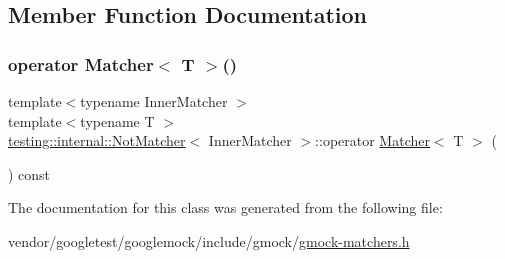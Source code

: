 \subsection{Member Function Documentation}
\mbox{\label{classtesting_1_1internal_1_1_not_matcher_a87ad7beadf9def58cc053229e99e8625}} 
\subsubsection{\texorpdfstring{operator Matcher$<$ T $>$()}{operator Matcher< T >()}}
{\footnotesize\ttfamily template$<$typename Inner\+Matcher $>$ \\
template$<$typename T $>$ \\
\hyperlink{classtesting_1_1internal_1_1_not_matcher}{testing\+::internal\+::\+Not\+Matcher}$<$ Inner\+Matcher $>$\+::operator \hyperlink{classtesting_1_1_matcher}{Matcher}$<$ T $>$ (\begin{DoxyParamCaption}{ }\end{DoxyParamCaption}) const\hspace{0.3cm}{\ttfamily [inline]}}



The documentation for this class was generated from the following file\+:\begin{DoxyCompactItemize}
\item 
vendor/googletest/googlemock/include/gmock/\hyperlink{gmock-matchers_8h}{gmock-\/matchers.\+h}\end{DoxyCompactItemize}

